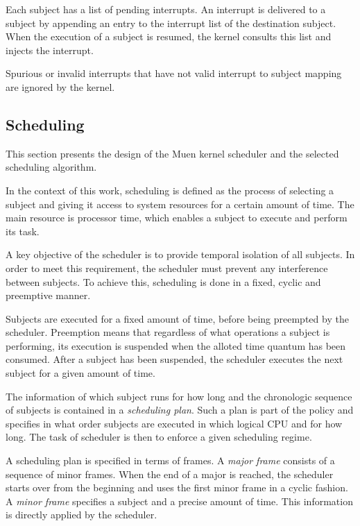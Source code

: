 Each subject has a list of pending interrupts. An interrupt is delivered to a
subject by appending an entry to the interrupt list of the destination subject.
When the execution of a subject is resumed, the kernel consults this list and
injects the interrupt.

Spurious or invalid interrupts that have not valid interrupt to subject mapping
are ignored by the kernel.

\subsection{Scheduling}\label{subsec:scheduling}
This section presents the design of the Muen kernel scheduler and the selected
scheduling algorithm.

In the context of this work, scheduling is defined as the process of selecting
a subject and giving it access to system resources for a certain amount of time.
The main resource is processor time, which enables a subject to execute and
perform its task.

A key objective of the scheduler is to provide temporal isolation of all
subjects. In order to meet this requirement, the scheduler must prevent any
interference between subjects. To achieve this, scheduling is done in a fixed,
cyclic and preemptive manner.

Subjects are executed for a fixed amount of time, before being preempted by the
scheduler. Preemption means that regardless of what operations a subject is
performing, its execution is suspended when the alloted time quantum has been
consumed. After a subject has been suspended, the scheduler executes the next
subject for a given amount of time.

The information of which subject runs for how long and the chronologic sequence
of subjects is contained in a \emph{scheduling plan}.
Such a plan is part of the policy and specifies in what order subjects are
executed in which logical CPU and for how long. The task of scheduler is then to
enforce a given scheduling regime.

A scheduling plan is specified in terms of frames. A \emph{major frame}
 consists of a sequence of minor frames. When the end of a
major is reached, the scheduler starts over from the beginning and uses the
first minor frame in a cyclic fashion. A \emph{minor frame}
specifies a subject and a precise amount of time. This information is directly
applied by the scheduler.

